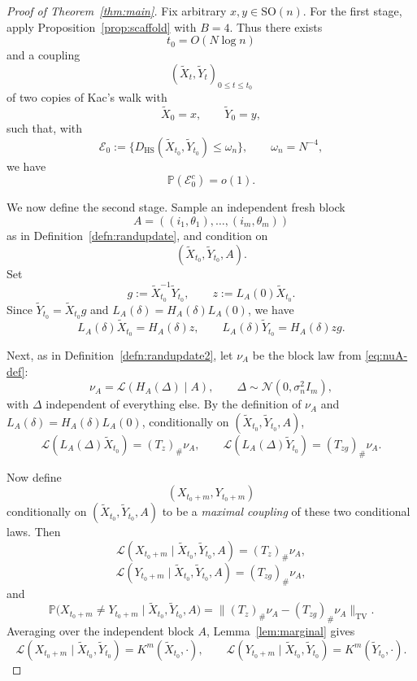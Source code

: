 \documentclass[11pt, reqno]{amsart}
\numberwithin{equation}{section}
\theoremstyle{remark}
\newcommand{\Prob}{\mathbb{P}}
\newcommand{\1}{\mathbf{1}}
\newcommand{\SO}{\mathrm{SO}}
\newcommand{\HS}{\mathrm{HS}}
\newcommand{\Law}{\mathcal{L}}
\newcommand{\TV}{\mathrm{TV}}
\begin{document}
\begin{proof}[Proof of Theorem~\ref{thm:main}]
Fix arbitrary $x,y\in \SO(n)$. For the first stage, apply Proposition~\ref{prop:scaffold} with $B=4$.
Thus there exists
\[
t_0=O(N\log n)
\]
and a coupling
\[
(\widetilde X_t,\widetilde Y_t)_{0\le t\le t_0}
\]
of two copies of Kac's walk with
\[
\widetilde X_0=x,
\qquad
\widetilde Y_0=y,
\]
such that, with
\[
\mathcal E_0:=\{D_{\HS}(\widetilde X_{t_0},\widetilde Y_{t_0})\le \omega_n\},
\qquad
\omega_n=N^{-4},
\]
we have
\begin{equation}
\label{eq:first-stage-event}
\Prob(\mathcal E_0^c)=o(1).
\end{equation}

We now define the second stage. Sample an independent fresh block
\[
A=((i_1,\theta_1),\dots,(i_m,\theta_m))
\]
as in Definition~\ref{defn:randupdate}, and condition on
\[
(\widetilde X_{t_0},\widetilde Y_{t_0},A).
\]
Set
\[
g:=\widetilde X_{t_0}^{-1}\widetilde Y_{t_0},
\qquad
z:=L_A(0)\widetilde X_{t_0}.
\]
Since \(\widetilde Y_{t_0}=\widetilde X_{t_0}g\) and
\(L_A(\delta)=H_A(\delta)L_A(0)\), we have
\[
L_A(\delta)\widetilde X_{t_0}=H_A(\delta)z,
\qquad
L_A(\delta)\widetilde Y_{t_0}=H_A(\delta)zg.
\]

Next, as in Definition~\ref{defn:randupdate2}, let \(\nu_A\) be the block law from
\eqref{eq:nuA-def}:
\[
\nu_A=\Law(H_A(\Delta)\mid A),
\qquad
\Delta\sim\mathcal N(0,\sigma_n^2I_m),
\]
with \(\Delta\) independent of everything else. By the definition of \(\nu_A\) and
\(L_A(\delta)=H_A(\delta)L_A(0)\), conditionally on
\((\widetilde X_{t_0},\widetilde Y_{t_0},A)\),
\[
\Law(L_A(\Delta)\widetilde X_{t_0})=(T_z)_\#\nu_A,
\qquad
\Law(L_A(\Delta)\widetilde Y_{t_0})=(T_{zg})_\#\nu_A.
\]

Now define
\[
(X_{t_0+m},Y_{t_0+m})
\]
conditionally on \((\widetilde X_{t_0},\widetilde Y_{t_0},A)\) to be a
\emph{maximal coupling} of these two conditional laws. Then
\[
\Law(X_{t_0+m}\mid \widetilde X_{t_0},\widetilde Y_{t_0},A)
=
(T_z)_\#\nu_A,
\]
\[
\Law(Y_{t_0+m}\mid \widetilde X_{t_0},\widetilde Y_{t_0},A)
=
(T_{zg})_\#\nu_A,
\]
and
\begin{equation}
\label{eq:conditional-mismatch}
\Prob\!\bigl(X_{t_0+m}\neq Y_{t_0+m}\mid \widetilde X_{t_0},\widetilde Y_{t_0},A\bigr)
=
\|(T_z)_\#\nu_A-(T_{zg})_\#\nu_A\|_{\TV}.
\end{equation}
Averaging over the independent block \(A\), Lemma~\ref{lem:marginal} gives
\[
\Law(X_{t_0+m}\mid \widetilde X_{t_0},\widetilde Y_{t_0})
=
K^m(\widetilde X_{t_0},\cdot),
\qquad
\Law(Y_{t_0+m}\mid \widetilde X_{t_0},\widetilde Y_{t_0})
=
K^m(\widetilde Y_{t_0},\cdot).
\]


\end{proof}
\end{document}
